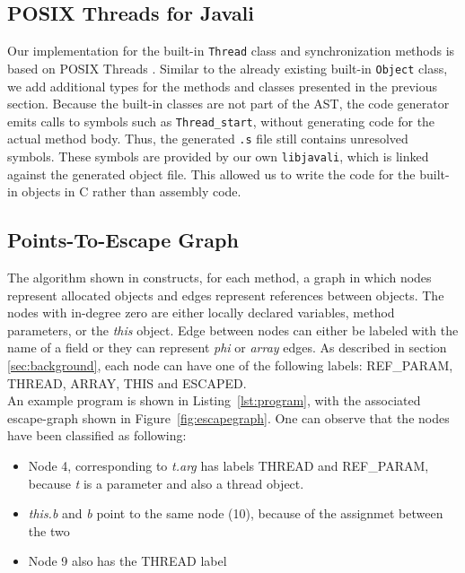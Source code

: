 \documentclass[letterpaper]{article}
\begin{document}
\subsection{POSIX Threads for Javali}
Our implementation for the built-in \texttt{Thread} class and synchronization
methods is based on POSIX Threads \cite{PThreads}. Similar to the already existing built-in
\texttt{Object} class, we add additional types for the methods and
classes presented in the previous section. Because the built-in classes
are not part of the AST, the code generator emits calls to symbols such as
\texttt{Thread\_start}, without generating code for the actual method body.
Thus, the generated \texttt{.s} file still contains
unresolved symbols. These symbols are provided by our own \texttt{libjavali},
which is linked against the generated object file. This allowed us to write
the code for the built-in objects in C rather than assembly code.

\subsection{Points-To-Escape Graph}
The algorithm shown in \cite{Whaley:99} constructs, for each method,
a graph in which nodes represent allocated objects and edges represent references between objects.
The nodes with in-degree zero are either locally declared variables, method parameters, or the \textit{this}
object. Edge between nodes can either be labeled with the name of a field or they can represent \textit{phi}
or \textit{array} edges. As described in
section \ref{sec:background}, each node can have one of the following labels: REF\_PARAM, THREAD, ARRAY, THIS and ESCAPED. \\
An example program is shown in Listing~\ref{lst:program}, with the associated escape-graph shown in Figure~\ref{fig:escapegraph}.
One can observe that the nodes have been classified as following:
\begin{itemize}
  \item Node 4, corresponding to \textit{t.arg} has labels THREAD and REF\_PARAM, because \textit{t} is a parameter and also a thread object.
  \item \textit{this.b} and \textit{b} point to the same node (10), because of the assignmet between the two
  \item Node 9 also has the THREAD label
\end{itemize}
\end{document}
